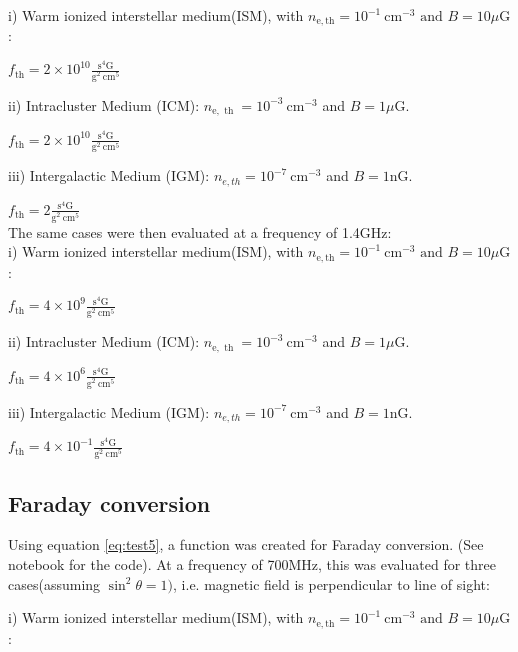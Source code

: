\documentclass[apj]{emulateapj}
\begin{document}
i) Warm ionized interstellar medium(ISM), with $n_{\mathrm{e}, \mathrm{th}}=10^{-1} \mathrm{~cm}^{-3} \text { and } B=10 \mu \mathrm{G}$: 

$f_{\mathrm{th}}=2 \times 10^{10} \frac{\mathrm{s}^4 \mathrm{G}}{\mathrm{g}^2 \mathrm{~cm}^5}$

ii) Intracluster Medium (ICM): $n_{\mathrm{e}, \text { th }}=10^{-3} \mathrm{~cm}^{-3}$ and $B=1 \mu \mathrm{G}$.

$f_{\mathrm{th}}=2 \times 10^{10} \frac{\mathrm{s}^4 \mathrm{G}}{\mathrm{g}^2 \mathrm{~cm}^5}$

iii) Intergalactic Medium (IGM): $n_{e, t h}=10^{-7} \mathrm{~cm}^{-3}$ and $B=1 \mathrm{nG}$.


$f_{\mathrm{th}}=2 \frac{\mathrm{s}^4 \mathrm{G}}{\mathrm{g}^2 \mathrm{~cm}^5}$\\



The same cases were then evaluated at a frequency of 1.4GHz:
\\
i) Warm ionized interstellar medium(ISM), with 
$n_{\mathrm{e}, \mathrm{th}}=10^{-1} \mathrm{~cm}^{-3} \text { and } B=10 \mu \mathrm{G}$: 

$f_{\mathrm{th}}=4 \times 10^{9} \frac{\mathrm{s}^4 \mathrm{G}}{\mathrm{g}^2 \mathrm{~cm}^5}$

ii) Intracluster Medium (ICM): $n_{\mathrm{e}, \text { th }}=10^{-3} \mathrm{~cm}^{-3}$ and $B=1 \mu \mathrm{G}$.

$f_{\mathrm{th}}=4 \times 10^{6} \frac{\mathrm{s}^4 \mathrm{G}}{\mathrm{g}^2 \mathrm{~cm}^5}$


iii) Intergalactic Medium (IGM): $n_{e, t h}=10^{-7} \mathrm{~cm}^{-3}$ and $B=1 \mathrm{nG}$.

$f_{\mathrm{th}}=4 \times 10^{-1} \frac{\mathrm{s}^4 \mathrm{G}}{\mathrm{g}^2 \mathrm{~cm}^5}$

\subsection{Faraday conversion}
Using equation \eqref{eq:test5}, a function was created  for Faraday conversion. (See notebook for the code).  At a frequency of 700MHz, this was evaluated for three cases(assuming $\sin ^2 \theta=1)$, i.e. magnetic field is perpendicular to line of sight:

i) Warm ionized interstellar medium(ISM), with $n_{\mathrm{e}, \mathrm{th}}=10^{-1} \mathrm{~cm}^{-3} \text { and } B=10 \mu \mathrm{G}$: 
\end{document}
